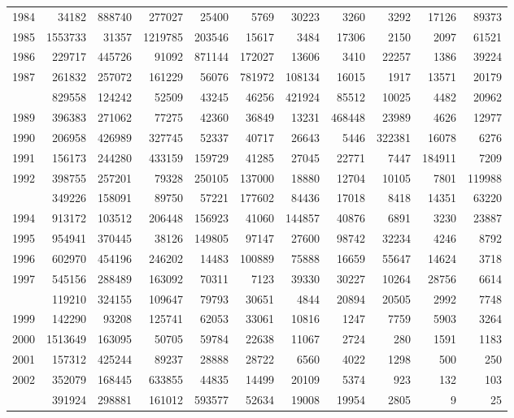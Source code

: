 \documentclass[
]{article}
\begin{document}
\begin{longtable}[t]{lrrrrrrrrrr}
1984 & 34182 & 888740 & 277027 & 25400 & 5769 & 30223 & 3260 & 3292 & 17126 & 89373\\
1985 & 1553733 & 31357 & 1219785 & 203546 & 15617 & 3484 & 17306 & 2150 & 2097 & 61521\\
1986 & 229717 & 445726 & 91092 & 871144 & 172027 & 13606 & 3410 & 22257 & 1386 & 39224\\
1987 & 261832 & 257072 & 161229 & 56076 & 781972 & 108134 & 16015 & 1917 & 13571 & 20179\\
\addlinespace
1988 & 829558 & 124242 & 52509 & 43245 & 46256 & 421924 & 85512 & 10025 & 4482 & 20962\\
1989 & 396383 & 271062 & 77275 & 42360 & 36849 & 13231 & 468448 & 23989 & 4626 & 12977\\
1990 & 206958 & 426989 & 327745 & 52337 & 40717 & 26643 & 5446 & 322381 & 16078 & 6276\\
1991 & 156173 & 244280 & 433159 & 159729 & 41285 & 27045 & 22771 & 7447 & 184911 & 7209\\
1992 & 398755 & 257201 & 79328 & 250105 & 137000 & 18880 & 12704 & 10105 & 7801 & 119988\\
\addlinespace
1993 & 349226 & 158091 & 89750 & 57221 & 177602 & 84436 & 17018 & 8418 & 14351 & 63220\\
1994 & 913172 & 103512 & 206448 & 156923 & 41060 & 144857 & 40876 & 6891 & 3230 & 23887\\
1995 & 954941 & 370445 & 38126 & 149805 & 97147 & 27600 & 98742 & 32234 & 4246 & 8792\\
1996 & 602970 & 454196 & 246202 & 14483 & 100889 & 75888 & 16659 & 55647 & 14624 & 3718\\
1997 & 545156 & 288489 & 163092 & 70311 & 7123 & 39330 & 30227 & 10264 & 28756 & 6614\\
\addlinespace
1998 & 119210 & 324155 & 109647 & 79793 & 30651 & 4844 & 20894 & 20505 & 2992 & 7748\\
1999 & 142290 & 93208 & 125741 & 62053 & 33061 & 10816 & 1247 & 7759 & 5903 & 3264\\
2000 & 1513649 & 163095 & 50705 & 59784 & 22638 & 11067 & 2724 & 280 & 1591 & 1183\\
2001 & 157312 & 425244 & 89237 & 28888 & 28722 & 6560 & 4022 & 1298 & 500 & 250\\
2002 & 352079 & 168445 & 633855 & 44835 & 14499 & 20109 & 5374 & 923 & 132 & 103\\
\addlinespace
2003 & 391924 & 298881 & 161012 & 593577 & 52634 & 19008 & 19954 & 2805 & 9 & 25\\

\end{longtable}
\end{document}
